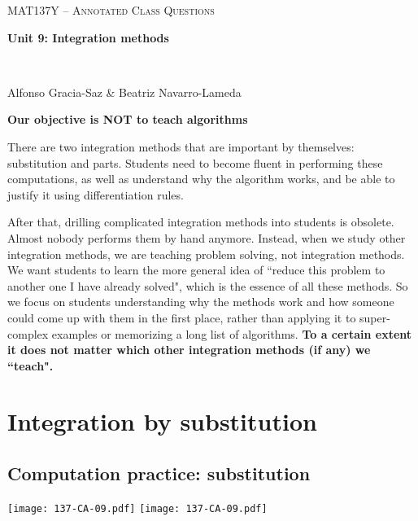 \documentclass[11pt]{article}
\begin{document}
\thispagestyle{empty}
	\begin{center}
		{ {\LARGE  \scshape
		\textcolor{137cp3}{MAT137Y --   Annotated Class Questions}
		}
		
		\medskip
		{\bf \Large \textcolor{137cp1}{Unit 9: Integration methods
		}}
		
		\
		
		\medskip
		{\large
		\textcolor{137cp1}{Alfonso Gracia-Saz \& Beatriz Navarro-Lameda}
		}}
	\end{center}

\vspace{5mm}

{\bf Our objective is NOT to teach algorithms}

\baselineskip

There are two integration methods that are important by themselves: substitution and parts.  Students need to become fluent in performing these computations, as well as understand why the algorithm works, and be able to justify it using differentiation rules.

\baselineskip

After that, drilling complicated integration methods into students is obsolete.  Almost nobody performs them by hand anymore.    Instead, when we study other integration methods, we are teaching problem solving, not integration methods.    We want students to learn the more general idea of ``reduce this problem to another one I have already solved", which is the essence of all these methods.  So we focus on students understanding why the methods work and how someone could come up with them in the first place, rather than applying it to super-complex examples or memorizing a long list of algorithms.  {\bf To a certain extent it does not matter which other integration methods (if any) we ``teach".}

\tableofcontents

\newpage

\section{Integration by substitution}
\subsection{Computation practice: substitution}

\begin{center}
{ \texttt{[image: 137-CA-09.pdf]}} \quad
{ \texttt{[image: 137-CA-09.pdf]}} 
\end{center}
\end{document}
